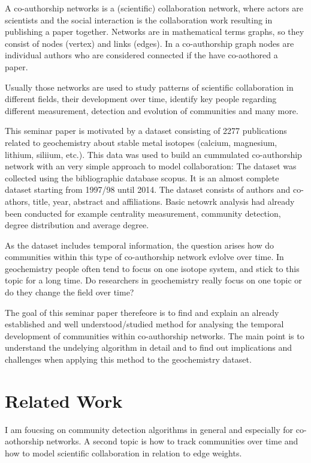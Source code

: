 \documentclass[runningheads,a4paper]{llncs}
\begin{document}
A co-authorship networks is a (scientific) collaboration network, where actors are scientists and the social interaction is the collaboration work resulting in publishing a paper together.
Networks are in mathematical terms graphs, so they consist of nodes (vertex) and links (edges).
In a co-authorship graph nodes are individual authors who are considered connected if the have co-aothored a paper.~\cite{newman2001structure}

Usually those networks are used to study patterns of scientific collaboration in different fields, their development over time, identify key people regarding different measurement, detection and evolution of communities and many more.~\cite{barabasi2002evolution, newman2001structure, newman2004coauthorship} 

This seminar paper is motivated by a dataset consisting of 2277 publications related to geochemistry about stable metal isotopes (calcium, magnesium, lithium, siliium, etc.). This data was used to build an cummulated co-authorship network with an very simple approach to model collaboration: 
The dataset was collected using the bibliographic database scopus.
It is an almost complete dataset starting from 1997/98 until 2014.
The dataset consists of authors and co-athors, title, year, abstract and affiliations.
Basic netowrk analysis had already been conducted for example centrality measurement, community detection, degree distribution and average degree.

As the dataset includes temporal information, the question arises how do communities within this type of co-authorship network evlolve over time. In geochemistry people often tend to focus on one isotope system, and stick to this topic for a long time. Do researchers in geochemistry really focus on one topic or do they change the field over time?

The goal of this seminar paper therefeore is to find and explain an already established and well understood/studied method for analysing the temporal development of communities within co-authorship networks. The main point is to understand the undelying algorithm in detail and to find out implications and challenges when applying this method to the geochemistry dataset.

\section{Related Work}
\label{related}
I am foucsing on community detection algorithms in general and especially for co-aothorship networks. A second topic is how to track communities over time and how to model scientific collaboration in relation to edge weights.
\end{document}
